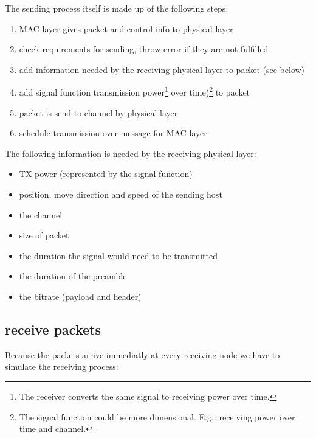 The sending process itself is made up of the following steps:

\begin{enumerate}
 \item MAC layer gives packet and control info to physical layer
 \item check requirements for sending, throw error if they are not fulfilled
 \item add information needed by the receiving physical layer to packet (see below)
 \item add signal function transmission power\footnote{The receiver converts the same signal to receiving power over time.} over time)\footnote{The signal function could be more dimensional. E.g.: receiving power over time and channel.} to packet
 \item packet is send to channel by physical layer
 \item schedule transmission over message for MAC layer
\end{enumerate}

The following information is needed by the receiving physical layer:

\begin{itemize}
\item TX power (represented by the signal function)
\item position, move direction and speed of the sending host
\item the channel
\item size of packet
\item the duration the signal would need to be transmitted
\item the duration of the preamble
\item the bitrate (payload and header)
\end{itemize}

\subsection{receive packets}
\label{receivePackets}

Because the packets arrive immediatly at every receiving node we have to simulate the receiving process:

